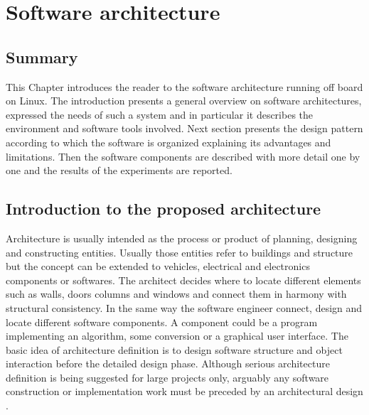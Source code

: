 
\chapter{Software architecture}
\label{chap:sixth
}
\ifpdf
    \graphicspath{{Chapter6/Figures/PNG/}{Chapter6/Figures/PDF/}{Chapter6/Figures/}}
\else
    \graphicspath{{Chapter6/Figures/EPS/}{Chapter6/Figures/}}
\fi

\section*{Summary}

This Chapter introduces the reader to the software architecture running off board on Linux. The introduction presents a  general overview on software architectures, expressed the needs of such a system and in particular it describes the environment and software tools involved. Next section presents the design pattern according to which the software is organized explaining its advantages and limitations. Then the software components are described with more detail one by one and the results of the experiments are reported. 
\section{Introduction to the proposed architecture}

Architecture is usually intended as the process or product of planning, designing and constructing entities. Usually those entities refer to buildings and structure but the concept can be extended to vehicles, electrical and electronics components or softwares. The architect decides where to locate different elements such as walls, doors columns and windows and connect them in harmony with structural consistency. In the same way the software engineer connect, design and locate different software components. A component could be a program implementing an algorithm, some conversion or a graphical user interface. The basic idea of architecture definition is to design software structure and object interaction before the detailed design phase. Although serious architecture definition is being suggested for large projects only, arguably any software construction or implementation work must be preceded by an architectural design \cite{msdn}.
